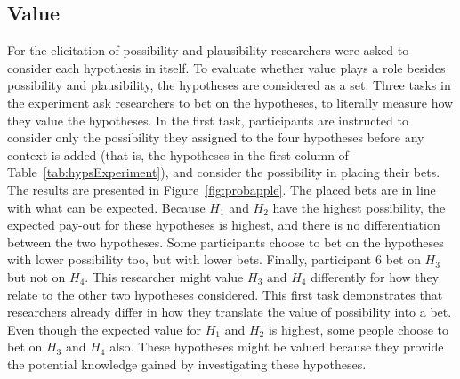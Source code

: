 \documentclass[man]{apa6}
\begin{document}
\subsection{Value}
For the elicitation of possibility and plausibility researchers were asked to consider each hypothesis in itself.
To evaluate whether value plays a role besides possibility and plausibility, the hypotheses are considered as a set.
Three tasks in the experiment ask researchers to bet on the hypotheses, to literally measure how they value the hypotheses.
In the first task, participants are instructed to consider only the possibility they assigned to the four hypotheses before any context is added (that is, the hypotheses in the first column of Table~\ref{tab:hypsExperiment}), and consider the possibility in placing their bets.
The results are presented in Figure~\ref{fig:probapple}. 
The placed bets are in line with what can be expected. 
Because $H_1$ and $H_2$ have the highest possibility, the expected pay-out for these hypotheses is highest, and there is no differentiation between the two hypotheses.
Some participants choose to bet on the hypotheses with lower possibility too, but with lower bets.
Finally, participant $6$ bet on $H_3$ but not on $H_4$.
This researcher might value $H_3$ and $H_4$ differently for how they relate to the other two hypotheses considered.
This first task demonstrates that researchers already differ in how they translate the value of possibility into a bet.
Even though the expected value for $H_1$ and $H_2$ is highest, some people choose to bet on $H_3$ and $H_4$ also.
These hypotheses might be valued because they provide the potential knowledge gained by investigating these hypotheses.
\end{document}
